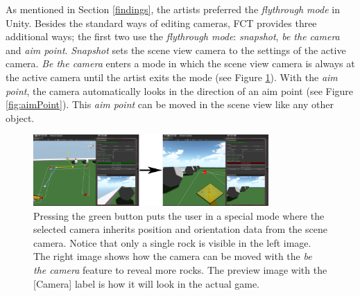 As mentioned in Section \ref{findings}, the artists preferred the \textit{flythrough mode} in Unity. Besides the standard ways of editing cameras, FCT provides three additional ways; the first two use the \textit{flythrough mode}: \textit{snapshot}, \textit{be the camera} and \textit{aim point}. \textit{Snapshot} sets the scene view camera to the settings of the active camera. \textit{Be the camera} enters a mode in which the scene view camera is always at the active camera until the artist exits the mode (see Figure \ref{fig:beTheCam}). With the \textit{aim point}, the camera automatically looks in the direction of an aim point (see Figure \ref{fig:aimPoint}). This \textit{aim point} can be moved in the scene view like any other object.


\begin{figure}[htbp]
\centering
\includegraphics[width=0.8\textwidth]{Pics/beTheCam}
\caption{Pressing the green button puts the user in a special mode where the selected camera inherits position and orientation data from the scene camera. Notice that only a single rock is visible in the left image. The right image shows how the camera can be moved with the \textit{be the camera} feature to reveal more rocks. The preview image with the [Camera] label is how it will look in the actual game.}
\label{fig:beTheCam}
\end{figure}

